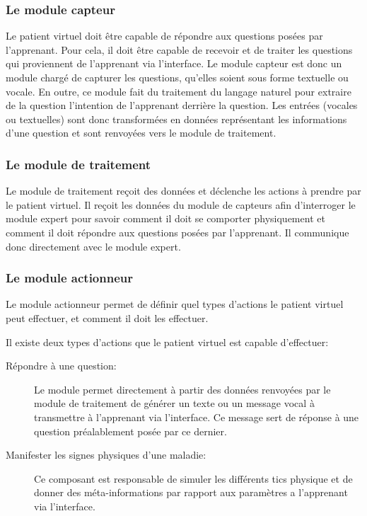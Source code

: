    \subsubsection{Le module capteur}
    Le patient virtuel doit être capable de répondre aux questions posées par l'apprenant. Pour cela, il doit être capable de recevoir et de traiter les questions qui proviennent de l'apprenant via l'interface.
    Le module capteur est donc un module chargé de capturer les questions, qu'elles soient sous forme textuelle ou vocale. En outre, ce module fait du traitement du langage naturel pour extraire de la question l'intention de l'apprenant derrière la question. Les entrées (vocales ou textuelles) sont donc transformées en données représentant les informations d'une question et sont renvoyées vers le module de traitement.
    
    \subsubsection{Le module de traitement}
    Le module de traitement reçoit des données et déclenche les actions à prendre par le patient virtuel. Il reçoit les données du module de capteurs afin d'interroger le module expert pour savoir comment il doit se comporter physiquement et comment il doit répondre aux questions posées par l'apprenant. Il communique donc directement avec le module expert.
    
    \subsubsection{Le module actionneur}
    Le module actionneur permet de définir quel types d'actions le patient virtuel peut effectuer, et comment il doit les effectuer.
    
    Il existe deux types d'actions que le patient virtuel est capable d'effectuer:
    \begin{description}
        \item[Répondre à une question:] Le module permet directement à partir des données renvoyées par le module de traitement de générer un texte ou un message vocal à transmettre à l'apprenant via l'interface. Ce message sert de réponse à une question préalablement posée par ce dernier.
        \item[Manifester les signes physiques d'une maladie:] Ce composant est responsable de simuler les différents tics physique et de donner des méta-informations par rapport aux paramètres a l'apprenant via l'interface.
    \end{description}

